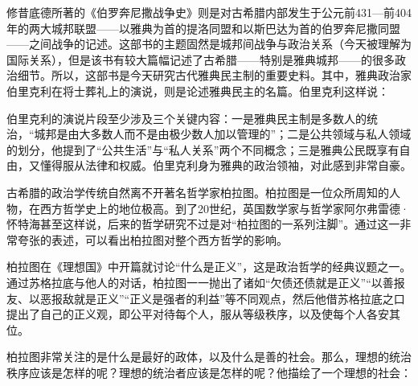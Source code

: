 修昔底德所著的《伯罗奔尼撒战争史》则是对古希腊内部发生于公元前431—前404年的两大城邦联盟——以雅典为首的提洛同盟和以斯巴达为首的伯罗奔尼撒同盟——之间战争的记述。这部书的主题固然是城邦间战争与政治关系（今天被理解为国际关系），但是该书有较大篇幅记述了古希腊——特别是雅典城邦——的很多政治细节。所以，这部书是今天研究古代雅典民主制的重要史料。其中，雅典政治家伯里克利在将士葬礼上的演说，则是论述雅典民主的名篇。伯里克利这样说：


伯里克利的演说片段至少涉及三个关键内容：一是雅典民主制是多数人的统治，“城邦是由大多数人而不是由极少数人加以管理的”；二是公共领域与私人领域的划分，他提到了“公共生活”与“私人关系”两个不同概念；三是雅典公民既享有自由，又懂得服从法律和权威。伯里克利身为雅典的政治领袖，对此感到非常自豪。

古希腊的政治学传统自然离不开著名哲学家柏拉图。柏拉图是一位众所周知的人物，在西方哲学史上的地位极高。到了20世纪，英国数学家与哲学家阿尔弗雷德·怀特海甚至这样说，后来的哲学研究不过是对“柏拉图的一系列注脚”。通过这一非常夸张的表述，可以看出柏拉图对整个西方哲学的影响。

柏拉图在《理想国》中开篇就讨论“什么是正义”，这是政治哲学的经典议题之一。通过苏格拉底与他人的对话，柏拉图一一抛出了诸如“欠债还债就是正义”“以善报友、以恶报敌就是正义”“正义是强者的利益”等不同观点，然后他借苏格拉底之口提出了自己的正义观，即公平对待每个人，服从等级秩序，以及使每个人各安其位。

柏拉图非常关注的是什么是最好的政体，以及什么是善的社会。那么，理想的统治秩序应该是怎样的呢？理想的统治者应该是怎样的呢？他描绘了一个理想的社会：


